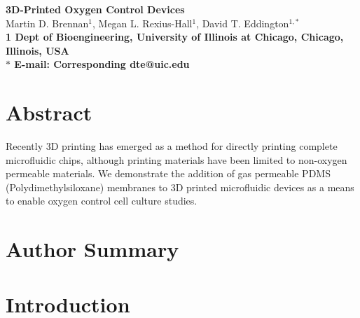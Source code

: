 \pagestyle{myheadings}







\begin{flushleft}
{\Large
\textbf{3D-Printed Oxygen Control Devices}
}
\\
Martin D. Brennan$^{1}$, 
Megan L. Rexius-Hall$^{1}$, 
David T. Eddington$^{1,\ast}$
\\
\bf{1} Dept of Bioengineering, University of Illinois at Chicago, Chicago, Illinois, USA
\\
$\ast$ E-mail: Corresponding dte@uic.edu
\end{flushleft}

\section*{Abstract}

Recently 3D printing has emerged as a method for directly printing complete microfluidic chips, 
although printing materials have been limited to non-oxygen permeable materials.
We demonstrate the addition of gas permeable PDMS (Polydimethylsiloxane) membranes to 3D printed microfluidic devices as a means to enable oxygen control cell culture studies.


\section*{Author Summary}



\section*{Introduction}

